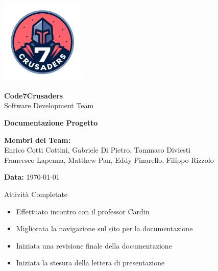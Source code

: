 \documentclass{beamer}
\begin{document}
\begin{frame}[plain] %
    \centering
    \vspace*{2cm}
    
    \includegraphics[width=0.3\textwidth]{../img/logo/7Crusaders_logo.png} %
    \vspace{1cm}
    
    {\Huge \textbf{Code7Crusaders}}\\
    \vspace{0.5cm}
    {\Large Software Development Team}\\
    \vspace{2cm}
    
    {\large \textbf{Documentazione Progetto}}\\
    \vspace{3cm}

    \textbf{Membri del Team:}\\
    Enrico Cotti Cottini, Gabriele Di Pietro, Tommaso Diviesti \\
    Francesco Lapenna, Matthew Pan, Eddy Pinarello, Filippo Rizzolo \\
    \vspace{1cm}
    
    {\large \textbf{Data:}} \today\\
    
    \vspace{1cm}
\end{frame}

\begin{frame}
    \begin{exampleblock}{Attività Completate}
        \begin{itemize}
            \item Effettuato incontro con il professor Cardin
            \item Migliorata la navigazione sul sito per la documentazione 
            \item Iniziata una revisione finale della documentazione 
            \item Iniziata la stesura della lettera di presentazione
        \end{itemize}
    \end{exampleblock}
\end{frame}
\end{document}
